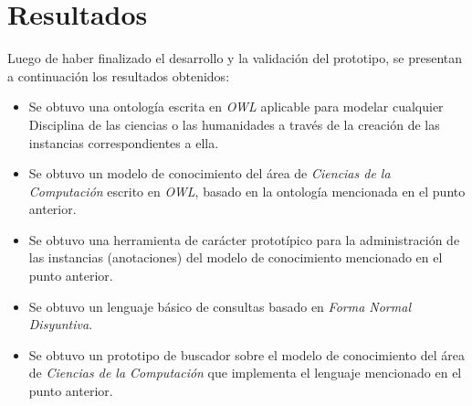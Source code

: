 \chapter{Resultados}
\label{chap:resultados}

Luego de haber finalizado el desarrollo y la validación del prototipo, se presentan a continuación los resultados obtenidos:

\begin{itemize}
    \item Se obtuvo una ontología escrita en \textit{OWL} aplicable para modelar cualquier Disciplina de las ciencias o las humanidades a través de la creación de las instancias correspondientes a ella.
    \item Se obtuvo un modelo de conocimiento del área de \textit{Ciencias de la Computación} escrito en \textit{OWL}, basado en la ontología mencionada en el punto anterior.
    \item Se obtuvo una herramienta de carácter prototípico para la administración de las instancias (anotaciones) del modelo de conocimiento mencionado en el punto anterior.
    \item Se obtuvo un lenguaje básico de consultas basado en \textit{Forma Normal Disyuntiva}.
    \item Se obtuvo un prototipo de buscador sobre el modelo de conocimiento del área de \textit{Ciencias de la Computación} que implementa el lenguaje mencionado en el punto anterior.
\end{itemize}
